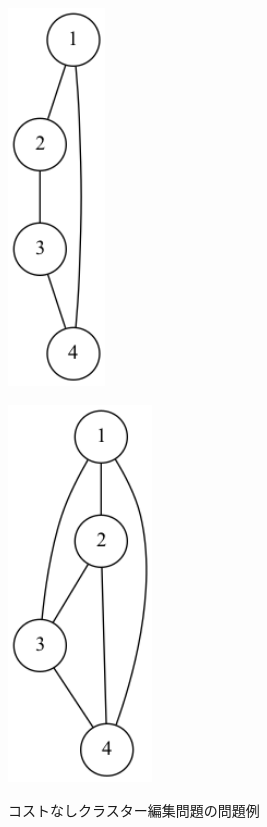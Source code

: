 \documentclass[10.5,a4paper,titlepage, dvipdfmx]{bxjsarticle}
\begin{document}
\begin{figure}[H]
    \centering
    \begin{minipage}{0.48\hsize}
        \centering
        \includegraphics[height=10cm]{example1.png}
        \label{fig:left}
    \end{minipage}
    \begin{minipage}{0.48\hsize}
        \centering
        \includegraphics[height=10cm]{example1_.png}
        \label{fig:right}
    \end{minipage}
    \caption{コストなしクラスター編集問題の問題例}
    \label{fig:left_right}
\end{figure}
\end{document}
